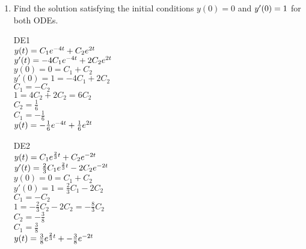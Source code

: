 \documentclass{article}
\begin{document}
\begin{enumerate}
\begin{enumerate}
\item Find the solution satisfying the initial conditions $y(0)=0$ and $y\sp\prime(0)=1$ for both ODEs.
\\
\begin{minipage}{0.45\textwidth}
DE1
\\$y(t)=C_1e\sp{-4t}+C_2e\sp{2t}$
\\$y'(t)=-4C_1e\sp{-4t}+2C_2e\sp{2t}$
\\$y(0)=0=C_1+C_2$
\\$y'(0)=1=-4C_1+2C_2$
\\$C_1=-C_2$
\\$1=4C_2+2C_2=6C_2$
\\$C_2=\frac{1}{6}$
\\$C_1=-\frac{1}{6}$
\\$y(t)=-\frac{1}{6}e\sp{-4t}+\frac{1}{6}e\sp{2t}$
\end{minipage}
\hfill
\begin{minipage}{0.45\textwidth}
DE2
\\$y(t)=C_1e\sp{\frac{2}{3}t}+C_2e\sp{-2t}$
\\$y'(t)=\frac{2}{3}C_1e\sp{\frac{2}{3}t}-2C_2e\sp{-2t}$
\\$y(0)=0=C_1+C_2$
\\$y'(0)=1=\frac{2}{3}C_1-2C_2$
\\$C_1=-C_2$
\\$1=-\frac{2}{3}C_2-2C_2=-\frac{8}{3}C_2$
\\$C_2=-\frac{3}{8}$
\\$C_1=\frac{3}{8}$
\\$y(t)=\frac{3}{8}e\sp{\frac{2}{3}t}+-\frac{3}{8}e\sp{-2t}$
\end{minipage}
\\

\end{enumerate}

\end{enumerate}
\end{document}
